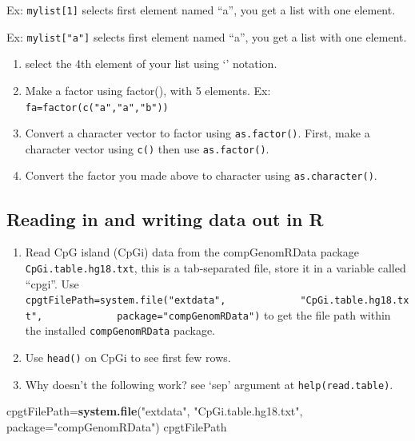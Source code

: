 \documentclass[12pt,]{krantz}
\newenvironment{Shaded}{\begin{snugshade}}{\end{snugshade}}
\newcommand{\DataTypeTok}[1]{\textcolor[rgb]{0.13,0.29,0.53}{#1}}
\newcommand{\KeywordTok}[1]{\textcolor[rgb]{0.13,0.29,0.53}{\textbf{#1}}}
\newcommand{\NormalTok}[1]{#1}
\newcommand{\StringTok}[1]{\textcolor[rgb]{0.31,0.60,0.02}{#1}}
\theoremstyle{definition}
\theoremstyle{definition}
\theoremstyle{definition}
\theoremstyle{remark}
\begin{document}
Ex: \texttt{mylist{[}1{]}} selects first element named ``a'', you get a
list with one element.

Ex: \texttt{mylist{[}"a"{]}} selects first element named ``a'', you get
a list with one element.

\begin{enumerate}
\def\labelenumi{\arabic{enumi}.}
\setcounter{enumi}{37}
\item
  select the 4th element of your list using
  `\protect\hyperlink{section-8}{}' notation.
\item
  Make a factor using factor(), with 5 elements. Ex:
  \texttt{fa=factor(c("a","a","b"))}
\item
  Convert a character vector to factor using \texttt{as.factor()}.
  First, make a character vector using \texttt{c()} then use
  \texttt{as.factor()}.
\item
  Convert the factor you made above to character using
  \texttt{as.character()}.
\end{enumerate}

\hypertarget{reading-in-and-writing-data-out-in-r}{%
\subsection{Reading in and writing data out in
R}\label{reading-in-and-writing-data-out-in-r}}

\begin{enumerate}
\def\labelenumi{\arabic{enumi}.}
\setcounter{enumi}{41}
\item
  Read CpG island (CpGi) data from the compGenomRData package
  \texttt{CpGi.table.hg18.txt}, this is a tab-separated file, store it
  in a variable called ``cpgi''. Use
  \texttt{cpgtFilePath=system.file("extdata",\ \ \ \ \ \ \ \ \ \ \ \ \ "CpGi.table.hg18.txt",\ \ \ \ \ \ \ \ \ \ \ \ \ package="compGenomRData")}
  to get the file path within the installed \texttt{compGenomRData}
  package.
\item
  Use \texttt{head()} on CpGi to see first few rows.
\item
  Why doesn't the following work? see `sep' argument at
  \texttt{help(read.table)}.
\end{enumerate}

\begin{Shaded}
\begin{Highlighting}[]
\NormalTok{cpgtFilePath=}\KeywordTok{system.file}\NormalTok{(}\StringTok{"extdata"}\NormalTok{,}
                \StringTok{"CpGi.table.hg18.txt"}\NormalTok{,}
                \DataTypeTok{package=}\StringTok{"compGenomRData"}\NormalTok{)}
\NormalTok{cpgtFilePath}
\end{Highlighting}
\end{Shaded}
\end{document}
